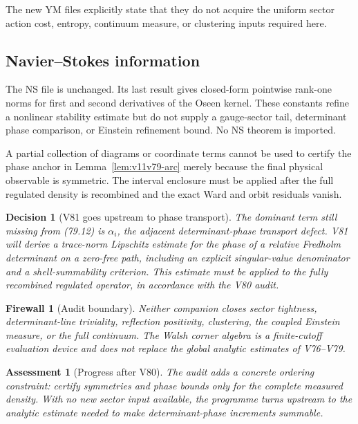 \documentclass[11pt]{article}
\newtheorem{assessment}[theorem]{Assessment}
\newtheorem{firewall}[theorem]{Firewall}
\newtheorem{decision}[theorem]{Decision}
\begin{document}
The new YM files explicitly state that they do not acquire the
uniform sector action cost, entropy, continuum measure, or clustering
inputs required here.

\subsection{Navier--Stokes information}

The NS file is unchanged.  Its last result gives closed-form
pointwise rank-one norms for first and second derivatives of the Oseen
kernel.  These constants refine a nonlinear stability estimate but
do not supply a gauge-sector tail, determinant phase comparison, or
Einstein refinement bound.  No NS theorem is imported.

\begin{warning}
\label{warn:v11v80-compression}
A partial collection of diagrams or coordinate terms cannot be used
to certify the phase anchor in Lemma~\ref{lem:v11v79-arc} merely
because the final physical observable is symmetric.  The interval
enclosure must be applied after the full regulated density is
recombined and the exact Ward and orbit residuals vanish.
\end{warning}

\begin{decision}[V81 goes upstream to phase transport]
\label{dec:v11v80-next}
The dominant term still missing from (79.12) is
\(\alpha_i\), the adjacent determinant-phase transport defect.
V81 will derive a trace-norm Lipschitz estimate for the phase of a
relative Fredholm determinant on a zero-free path, including an
explicit singular-value denominator and a shell-summability
criterion.  This estimate must be applied to the fully recombined
regulated operator, in accordance with the V80 audit.
\end{decision}

\begin{firewall}[Audit boundary]
\label{fire:v11v80-boundary}
Neither companion closes sector tightness, determinant-line
triviality, reflection positivity, clustering, the coupled Einstein
measure, or the full continuum.  The Walsh corner algebra is a
finite-cutoff evaluation device and does not replace the global
analytic estimates of V76--V79.
\end{firewall}

\begin{assessment}[Progress after V80]
\label{ass:v11v80-status}
The audit adds a concrete ordering constraint: certify symmetries and
phase bounds only for the complete measured density.  With no new
sector input available, the programme turns upstream to the analytic
estimate needed to make determinant-phase increments summable.
\end{assessment}
\end{document}
